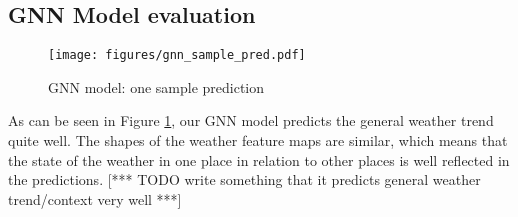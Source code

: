 \subsection{GNN Model evaluation}

\begin{figure}
    \centering
    \texttt{[image: figures/gnn\_sample\_pred.pdf]}
    \caption{GNN model: one sample prediction}
    \label{fig:gnn_pred}
\end{figure}

As can be seen in Figure \ref{fig:gnn_pred}, our GNN model predicts the general weather trend quite well. The shapes of the weather feature maps are similar, which means that the state of the weather in one place in relation to other places is well reflected in the predictions.
[*** TODO write something that it predicts general weather trend/context very well ***]


